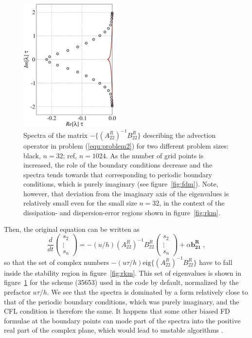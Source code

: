 {\begin{figure}
\includegraphics[clip,width=0.45\textwidth]{figs/AdvectionSpectra}
\caption{Spectra of the matrix $-\{(A^R_{22})^{-1}B^R_{22}\}$ describing the
  advection operator in problem (\ref{equ:problem2}) for two different problem
  sizes: black, $n=32$; ref, $n=1024$. As the number of grid points is
  increased, the role of the boundary conditions decrease and the spectra tends
  towards that corresponding to periodic boundary conditions, which is purely
  imaginary (see figure~\ref{fig:fdm}). Note, however, that deviation from the
  imaginary axis of the eigenvalues is relatively small even for the small size
  $n=32$, in the context of the dissipation- and dispersion-error regions shown
  in figure~\ref{fig:rkm}.}\label{fig:advection}
\end{figure}

Then, the original equation can be written as
\begin{equation}
\frac{d}{dt}
\left(\begin{array}{c}s_2\\\vdots\\s_n\end{array}\right) =
-(u/h)(A^R_{22})^{-1}B^R_{22}\left(\begin{array}{c}s_2\\\vdots\\s_n\end{array}\right)+
\alpha\mathbf{b^R_{21}} \;,
\end{equation}
so that the set of complex numbers $-(u\tau/h) \textrm{eig}
\{(A^R_{22})^{-1}B^R_{22}\}$ have to fall inside the stability region in
figure~\ref{fig:rkm}. This set of eigenvalues is shown in
figure~\ref{fig:advection} for the scheme (35653) used in the code by default,
normalized by the prefactor $u\tau/h$. We see that the spectra is dominated by a
form relatively close to that of the periodic boundary conditions, which was
purely imaginary, and the CFL condition is therefore the same. It happens that
some other biased FD formulae at the boundary points can mode part of the spectra
into the positive real part of the complex plane, which would lead to unstable
algorithms \citep{Carpenter:1993}.

}
